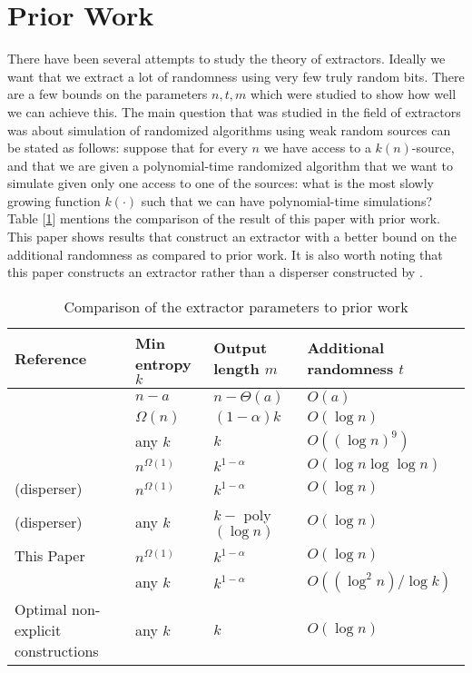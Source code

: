 \section{Prior Work}
There have been several attempts to study the theory of extractors. Ideally we want that we extract a lot of randomness using very few truly random bits. There are a few bounds on the parameters $n,t,m$ which were studied to show how well we can achieve this. The main question that was studied in the field of extractors was about simulation of randomized algorithms using weak random sources can be stated as follows: suppose that for every $n$ we have access to a $k(n)$-source, and that we are given a polynomial-time randomized algorithm that we want to simulate given only one access to one of the sources: what is the most slowly growing function $k(\cdot)$ such that we can have polynomial-time simulations?
\\
Table [\ref{prior}] mentions the comparison of the result of this paper with prior work. This paper shows results that construct an extractor with a better bound on the additional randomness as compared to prior work. It is also worth noting that this paper constructs an extractor rather than a disperser constructed by \cite{Saks:1998:EOP:273865.273915, Ta-Shma:1998:AOD:276698.276736}.
\bgroup
\def\arraystretch{1.25}
	\begin{table}[H]
		\centering
		\begin{tabular}{|>{\centering\arraybackslash}m{4cm} | >{\centering\arraybackslash}m{3cm} | >{\centering\arraybackslash}m{3.5cm} | >{\centering\arraybackslash}m{3.2cm} |}
			\hline
			\textbf{Reference} & \textbf{Min entropy $k$} & \textbf{Output length $m$} & \textbf{Additional randomness $t$}
			\\
			\hline
			\cite{Goldreich:1997:TFF:280116.280034} & $n-a$ & $n-\Theta(a)$ & $O(a)$ \\
			\hline
			\cite{Zuckerman:1996:RSE:237814.237878} & $\Omega(n)$ & $(1-\alpha)k$ & $O(\log n)$\\
			\hline
			\cite{Ta-Shma:1996:ERW:237814.237877} & any $k$ & $k$ & $O({(\log n)}^9)$\\
			\cite{Ta-Shma:1996:ERW:237814.237877} & $n^{\Omega{(1)}}$ & $k^{1-\alpha}$ & $O(\log n \log \log n)$\\
			\hline
			\cite{Saks:1998:EOP:273865.273915} (disperser) & $n^{\Omega{(1)}}$ & $k^{1-\alpha}$ & $O(\log n)$\\
			\cite{Ta-Shma:1998:AOD:276698.276736} (disperser)& any $k$ & $k -$ poly$(\log n)$ & $O(\log n)$\\
			\hline
			This Paper & $n^{\Omega{(1)}}$ & $k^{1-\alpha}$ & $O(\log n)$\\
			           & any $k$ & $k^{1-\alpha}$ & $O((\log^2 n)/\log k)$\\
			\hline
			Optimal non-explicit constructions & any $k$ & $k$ & $O(\log n)$\\
			\hline
		\end{tabular}
		
		\caption{Comparison of the extractor parameters to prior work}
		\label{prior}
	\end{table}
\egroup